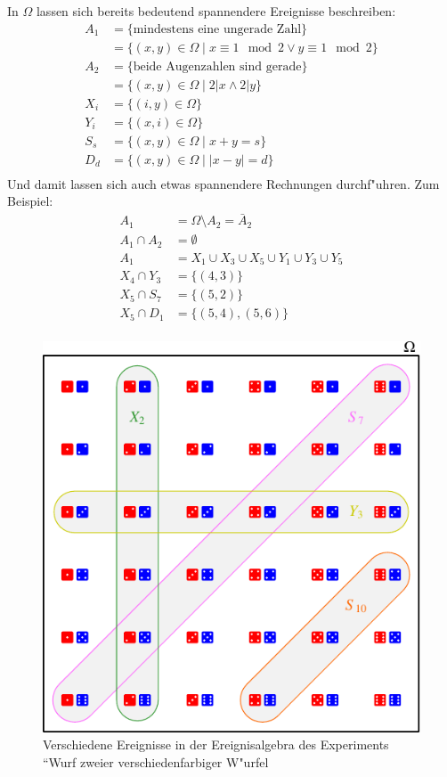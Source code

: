 In $\Omega$ lassen sich bereits bedeutend spannendere Ereignisse
beschreiben:
\begin{align*}
A_1&=\{\text{mindestens eine ungerade Zahl}\}\\
   &=\{(x,y)\in\Omega\;|\;x \equiv 1\mod 2 \vee y\equiv 1\mod 2\}\\
A_2&=\{\text{beide Augenzahlen sind gerade}\}\\
   &=\{(x,y)\in\Omega\;|\;2|x \wedge 2|y\}\\
X_i&=\{(i,y)\in\Omega\}\\
Y_i&=\{(x,i)\in\Omega\}\\
S_s&=\{(x,y)\in\Omega\;|\; x + y = s\}\\
D_d&=\{(x,y)\in\Omega\;|\; |x - y| = d\}\\
\end{align*}
Und damit lassen sich auch etwas spannendere Rechnungen durchf"uhren. Zum
Beispiel:
\begin{align*}
A_1&=\Omega \setminus A_2 = \bar A_2\\
A_1\cap A_2&=\emptyset\\
A_1&=X_1\cup X_3 \cup X_5\cup Y_1\cup Y_3\cup Y_5\\
X_4\cap Y_3&=\{(4,3)\}\\
X_5\cap S_7&=\{(5,2)\}\\
X_5\cap D_1&=\{(5,4), (5,6)\}\\
\end{align*}
\begin{figure}
\centering
\includegraphics{images/zweiwuerfel-1.pdf}
\caption{Verschiedene Ereignisse in der Ereignisalgebra des Experiments
``Wurf zweier verschiedenfarbiger W"urfel\label{zweiwuerfel}}
\end{figure}

